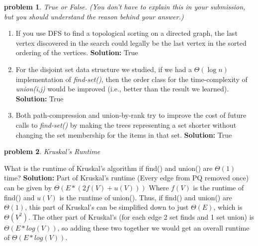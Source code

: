 \documentclass[10pt]{article}
\newcommand{\solution}[1]{\color{blue}\hfill\break\noindent\textbf{Solution:} #1\color{black}}
\newtheorem{problem}{\sc\color{cit}problem}
\begin{document}
\pagebreak

\begin{problem} True or False. (You don't have to explain this in your submission, but you should understand the reason behind your answer.)  \end{problem}

\begin{enumerate}
\renewcommand{\theenumi}{\Alph{enumi}}

    \item  If you use DFS to find a topological sorting on a directed graph, the last vertex discovered in the search could legally be the last vertex in the sorted ordering of the vertices.
    \solution{
    True
    }
    
    \item For the disjoint set data structure we studied, if we had a $\Theta(\log n)$ implementation of \emph{find-set()}, then the order class for the time-complexity of \emph{union(i,j)} would be improved (i.e., better than the result we learned).
    \solution{
    True
    }
    
    \item Both path-compression and union-by-rank try to improve the cost of future calls to \emph{find-set()} by making the trees representing a set shorter without changing the set membership for the items in that set.
    \solution{
    True
    }
    
\end{enumerate}

\begin{problem} Kruskal's Runtime \end{problem}
What is the runtime of Kruskal’s algorithm if find() and union() are $\Theta(1)$ time?
\solution{
    Part of Kruskal's runtime (Every edge from PQ removed once) can be given by $\Theta\left(E*\left( 2f(V) + u(V) \right) \right)$ Where $f(V)$ is the runtime of find() and $u(V)$ is the runtime of union(). Thus, if find() and union() are $\Theta(1)$, this part of Kruskal's can be simplified down to just  $\Theta(E)$, which is $\Theta(V^{2})$. The other part of Kruskal's (for each edge 2 set finds and 1 set union) is $\Theta(E * log(V))$, so adding these two together we would get an overall runtime of $\Theta(E * log(V))$.
}
\end{document}
